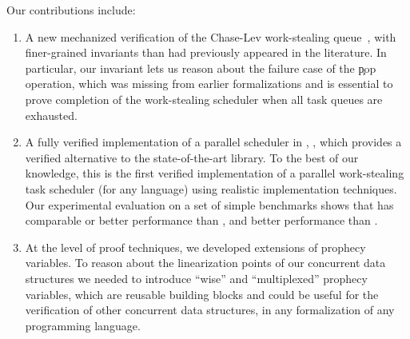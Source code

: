 Our contributions include:
\begin{enumerate}
  \item
    A new mechanized verification of the Chase-Lev work-stealing queue~\citep{DBLP:conf/spaa/ChaseL05}, with finer-grained invariants than had previously appeared in the literature.
    In particular, our invariant lets us reason about the failure case of the \c{pop} operation, which was missing from earlier formalizations and is essential to prove completion of the work-stealing scheduler when all task queues are exhausted.
  \item
    A fully verified implementation of a parallel scheduler in \OCamlFive, \Parabs, which provides a verified alternative to the state-of-the-art \Domainslib library.
    To the best of our knowledge, this is the first verified implementation of a parallel work-stealing task scheduler (for any language) using realistic implementation techniques.
    Our experimental evaluation on a set of simple benchmarks shows that \Parabs has comparable or better performance than \Domainslib, and better performance than \Moonpool.
  \item
    At the level of \Iris proof techniques, we developed extensions of prophecy variables.
    To reason about the linearization points of our concurrent data structures we needed to introduce ``wise'' and ``multiplexed'' prophecy variables, which are reusable building blocks and could be useful for the verification of other concurrent data structures, in any \Iris formalization of any programming language.
\end{enumerate}


